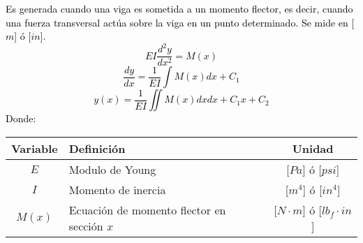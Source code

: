 \documentclass[letterpaper,11pt]{extarticle}
\newcommand{\mybox}[2]
{
    \begin{tcolorbox}[colback=color!5!white,colframe=color!75!black,boxsep=1pt,arc=0pt,outer arc=0pt,title={\textcolor{white}{#1}}]
        \textcolor{black}{#2}
    \end{tcolorbox}
}
\begin{document}
\begin{multicols}{2}
        \mybox{Deformacion por flexión:}
        {
            Es generada cuando una viga es sometida a un momento flector, es decir, cuando una fuerza transversal actúa sobre la viga en un punto determinado. Se mide en [$m$] ó [$in$].
            \begin{equation}
                EI\frac{d^2y}{dx^2} = M(x)
            \end{equation}
            \begin{equation}
                \frac{dy}{dx} = \frac{1}{EI}\int M(x)dx + C_1
            \end{equation}
            \begin{equation}
                y(x) = \frac{1}{EI}\iint M(x)dxdx + C_1x + C_2
            \end{equation}
            Donde:
            \begin{center}
                \begin{tabular}{ c | p{25mm} | c }
                    \hline Variable & Definición & Unidad \\ \hline 
                    $E$ & Modulo de Young & [$Pa$] ó [$psi$]\\
                    $I$ & Momento de inercia & [$m^4$] ó [$in^4$]\\
                    $M(x)$ & Ecuación de momento flector en sección $x$ & [$N \cdot m$] ó [$lb_f \cdot in$]\\ \hline
                \end{tabular}
            \end{center}
        }
    \end{multicols}

    \newpage
\end{document}
